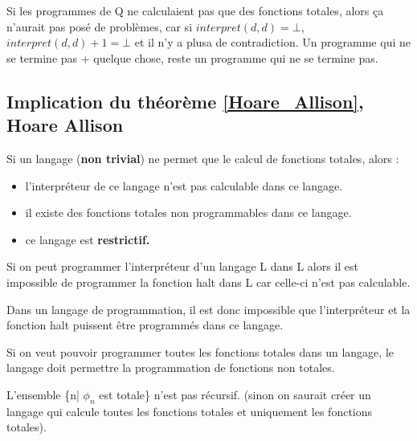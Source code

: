\begin{myrem}
	Si les programmes de Q ne calculaient pas que des fonctions totales, alors ça n'aurait pas posé de problèmes, car si $interpret(d,d)=\bot$, $interpret(d,d)+1=\bot$ et il n'y a plusa de contradiction.  Un programme qui ne se termine pas + quelque chose, reste un programme qui ne se termine pas.
\end{myrem}



\subsection{Implication du théorème \ref{Hoare_Allison}, Hoare Allison }

\begin{myprop}
	Si un langage (\textbf{non trivial}) ne permet que le calcul de fonctions totales, alors :
	\begin{itemize}
		\item l'interpréteur de ce langage n'est pas calculable dans ce langage.
		\item il existe des fonctions totales non programmables dans ce langage.
		\item ce langage est \bf{restrictif}.
	\end{itemize}
\end{myprop}

\begin{myprop}
	Si on peut programmer l'interpréteur d'un langage L dans L alors il est
	impossible de programmer la fonction halt dans L car celle-ci n'est pas calculable.
\end{myprop}

\begin{myprop}
	Dans un langage de programmation, il est donc impossible que
	l'interpréteur et la fonction halt puissent être programmés dans ce langage.
\end{myprop}

\begin{myprop}
	Si on veut pouvoir programmer toutes les fonctions totales dans un langage, le langage doit permettre la programmation de fonctions non totales.
\end{myprop}

\begin{myprop}
	L'ensemble \{n| $\phi_n$ est totale\} n'est pas récursif.
    (sinon on saurait créer un langage qui calcule toutes les fonctions totales et uniquement les fonctions totales).
\end{myprop}

